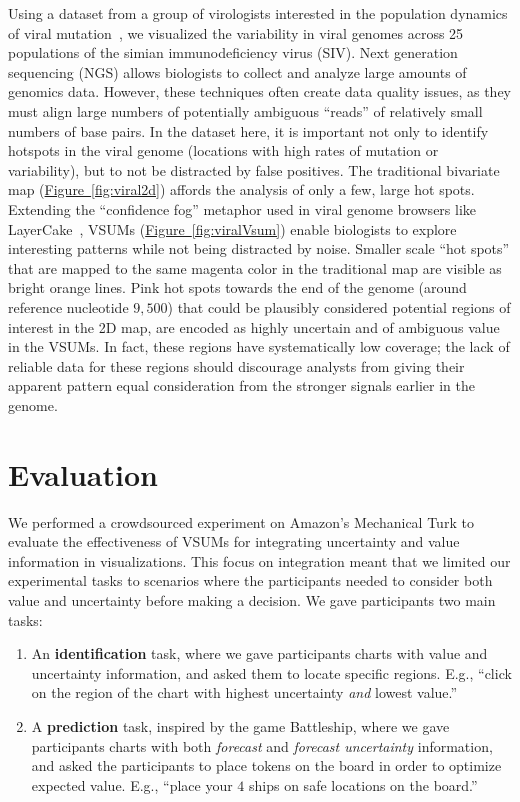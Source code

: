 \documentclass{vgtc}                          %
\newcommand{\figref}[1]{\hyperref[#1]{Figure~\ref*{#1}}}
\begin{document}
Using a dataset from a group of virologists interested in the population dynamics of viral mutation~\cite{o2012conditional}, we visualized the variability in viral genomes across 25 populations of the simian immunodeficiency virus (SIV). Next generation sequencing (NGS) allows biologists to collect and analyze large amounts of genomics data. However, these techniques often create data quality issues, as they must align large numbers of potentially ambiguous ``reads'' of relatively small numbers of base pairs. In the dataset here, it is important not only to identify hotspots in the viral genome (locations with high rates of mutation or variability), but to not be distracted by false positives. The traditional bivariate map (\figref{fig:viral2d}) affords the analysis of only a few, large hot spots. Extending the ``confidence fog'' metaphor used in viral genome browsers like LayerCake~\cite{correll2015layercake}, VSUMs (\figref{fig:viralVsum}) enable biologists to explore interesting patterns while not being distracted by noise. Smaller scale ``hot spots'' that are mapped to the same magenta color in the traditional map are visible as bright orange lines. Pink hot spots towards the end of the genome (around reference nucleotide $9,500$) that could be plausibly considered potential regions of interest in the 2D map, are encoded as highly uncertain and of ambiguous value in the VSUMs. In fact, these regions have systematically low coverage; the lack of reliable data for these regions should discourage analysts from giving their apparent pattern equal consideration from the  stronger signals earlier in the genome.

\section{Evaluation}

\conditionFig

We performed a crowdsourced experiment on Amazon's Mechanical Turk to evaluate the effectiveness of VSUMs for integrating uncertainty and value information in visualizations. This focus on integration meant that we limited our experimental tasks to scenarios where the participants needed to consider both value and uncertainty before making a decision. We gave participants two main tasks:

\begin{enumerate}
	\item An \textbf{identification} task, where we gave participants charts with value and uncertainty information, and asked them to locate specific regions. E.g., ``click on the region of the chart with highest uncertainty \emph{and} lowest value.''
	\item A \textbf{prediction} task, inspired by the game Battleship, where we gave participants charts with both \emph{forecast} and \emph{forecast uncertainty} information, and asked the participants to place tokens on the board in order to optimize expected value. E.g., ``place your $4$ ships on safe locations on the board.''
\end{enumerate}
\end{document}
